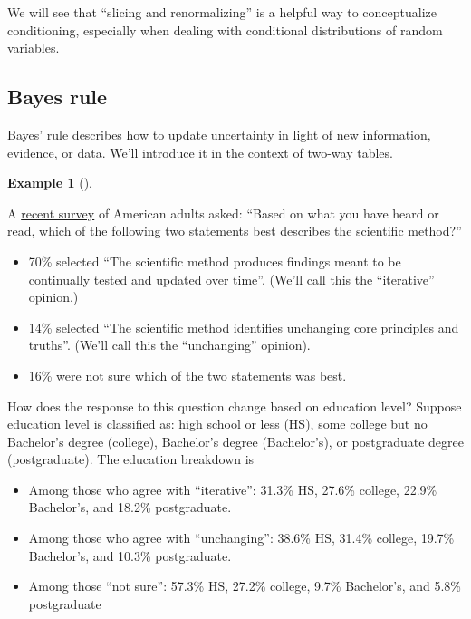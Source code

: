 \documentclass[
  letterpaper,
  DIV=11,
  numbers=noendperiod]{scrreprt}
\providecommand{\tightlist}{%
  \setlength{\itemsep}{0pt}\setlength{\parskip}{0pt}}
\theoremstyle{plain}
\theoremstyle{definition}
\newtheorem{example}{Example}[chapter]
\theoremstyle{definition}
\theoremstyle{definition}
\theoremstyle{remark}
\begin{document}
We will see that ``slicing and renormalizing'' is a helpful way to
conceptualize conditioning, especially when dealing with conditional
distributions of random variables.

\subsection{Bayes rule}\label{bayes-rule}

Bayes' rule describes how to update uncertainty in light of new
information, evidence, or data. We'll introduce it in the context of
two-way tables.

\begin{tcolorbox}[enhanced jigsaw, opacityback=0, left=2mm, colframe=quarto-callout-note-color-frame, toprule=.15mm, breakable, colback=white, leftrule=.75mm, arc=.35mm, rightrule=.15mm, bottomrule=.15mm]

\begin{example}[]\protect\hypertarget{exm-bayes-rule-iterative-twoway}{}\label{exm-bayes-rule-iterative-twoway}

A
\href{https://www.pewresearch.org/science/2019/03/28/what-americans-know-about-science/}{recent
survey} of American adults asked: ``Based on what you have heard or
read, which of the following two statements best describes the
scientific method?''

\begin{itemize}
\tightlist
\item
  70\% selected ``The scientific method produces findings meant to be
  continually tested and updated over time''. (We'll call this the
  ``iterative'' opinion.)
\item
  14\% selected ``The scientific method identifies unchanging core
  principles and truths''. (We'll call this the ``unchanging'' opinion).
\item
  16\% were not sure which of the two statements was best.
\end{itemize}

How does the response to this question change based on education level?
Suppose education level is classified as: high school or less (HS), some
college but no Bachelor's degree (college), Bachelor's degree
(Bachelor's), or postgraduate degree (postgraduate). The education
breakdown is

\begin{itemize}
\tightlist
\item
  Among those who agree with ``iterative'': 31.3\% HS, 27.6\% college,
  22.9\% Bachelor's, and 18.2\% postgraduate.
\item
  Among those who agree with ``unchanging'': 38.6\% HS, 31.4\% college,
  19.7\% Bachelor's, and 10.3\% postgraduate.
\item
  Among those ``not sure'': 57.3\% HS, 27.2\% college, 9.7\% Bachelor's,
  and 5.8\% postgraduate
\end{itemize}


\end{example}
\end{tcolorbox}
\end{document}
